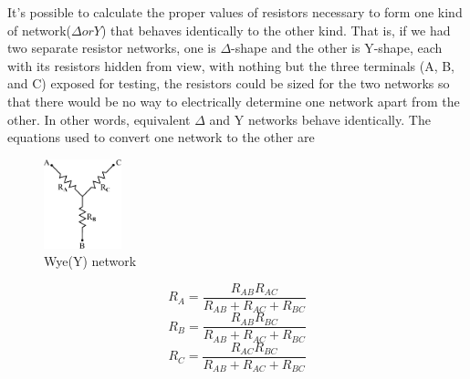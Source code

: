 \documentclass[a4 paper]{article}
\numberwithin{equation}{section}
\newcommand{\0}{\mathbf{0}}
\begin{document}
It's possible to calculate the proper values of resistors necessary to form one kind of network($\Delta or Y$) that behaves identically to the other kind. That is, if we had two separate resistor networks, one is $\Delta$-shape and the other is Y-shape, each with its resistors hidden from view, with nothing but the three terminals (A, B, and C) exposed for testing, the resistors could be sized for the two networks so that there would be no way to electrically determine one network apart from the other. In other words, equivalent $\Delta$ and Y networks behave identically.
The equations used to convert one network to the other are

\begin{paracol}{2}
\begin{leftcolumn*}

\begin{figure}[!ht]
  \caption{Wye(Y) network}
  \centering
  \includegraphics[width=0.2\textwidth]{./images/equ_resis1}
\end{figure}

\hspace{1.5 cm}{To convert a Delta($\Delta$) to a Wye(Y)}
\begin{equation}
R_A = \frac{R_{AB}R_{AC}}{R_{AB} + R_{AC} + R_{BC}}
\end{equation}
\begin{equation}
R_B = \frac{R_{AB}R_{BC}}{R_{AB} + R_{AC} + R_{BC}}
\end{equation}
\begin{equation}
R_C = \frac{R_{AC}R_{BC}}{R_{AB} + R_{AC} + R_{BC}}
\end{equation}

\end{leftcolumn*}

\begin{rightcolumn}


\end{rightcolumn}
\end{paracol}
\end{document}
